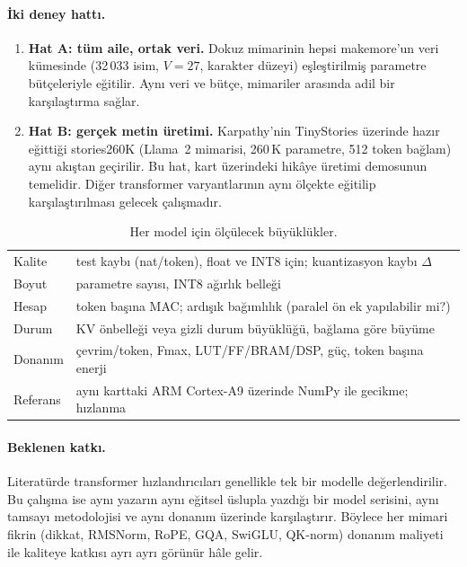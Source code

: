 \paragraph{İki deney hattı.}
\begin{enumerate}
  \item \textbf{Hat A: tüm aile, ortak veri.} Dokuz mimarinin hepsi makemore'un  veri kümesinde (32\,033 isim, $V=27$, karakter düzeyi) eşleştirilmiş parametre bütçeleriyle eğitilir. Aynı veri ve bütçe, mimariler arasında adil bir karşılaştırma sağlar.
  \item \textbf{Hat B: gerçek metin üretimi.} Karpathy'nin TinyStories üzerinde hazır eğittiği stories260K (Llama~2 mimarisi, 260\,K parametre, 512 token bağlam) aynı akıştan geçirilir. Bu hat, kart üzerindeki hikâye üretimi demosunun temelidir. Diğer transformer varyantlarının aynı ölçekte eğitilip karşılaştırılması gelecek çalışmadır.
\end{enumerate}

\begin{table}[h]
  \centering\small
  \caption{Her model için ölçülecek büyüklükler.}
  \label{tab:olcut}
  \begin{tabularx}{\textwidth}{@{}lL@{}}
    \toprule
     &  \\ \midrule
    Kalite & test kaybı (nat/token), float ve INT8 için; kuantizasyon kaybı $\Delta$ \\
    Boyut & parametre sayısı, INT8 ağırlık belleği \\
    Hesap & token başına MAC; ardışık bağımlılık (paralel ön ek yapılabilir mi?) \\
    Durum & KV önbelleği veya gizli durum büyüklüğü, bağlama göre büyüme \\
    Donanım & çevrim/token, Fmax, LUT/FF/BRAM/DSP, güç, token başına enerji \\
    Referans & aynı karttaki ARM Cortex-A9 üzerinde NumPy ile gecikme; hızlanma \\ \bottomrule
  \end{tabularx}
\end{table}

\paragraph{Beklenen katkı.} Literatürde transformer hızlandırıcıları genellikle tek bir modelle değerlendirilir. Bu çalışma ise aynı yazarın aynı eğitsel üslupla yazdığı bir model serisini, aynı tamsayı metodolojisi ve aynı donanım üzerinde karşılaştırır. Böylece her mimari fikrin (dikkat, RMSNorm, RoPE, GQA, SwiGLU, QK-norm) donanım maliyeti ile kaliteye katkısı ayrı ayrı görünür hâle gelir.
